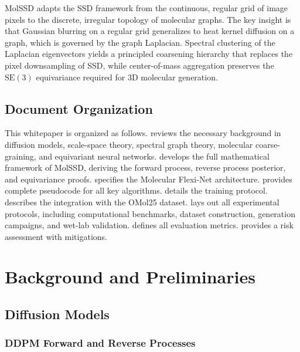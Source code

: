 \documentclass[12pt,a4paper]{article}
\begin{document}
MolSSD adapts the SSD framework from the continuous, regular grid of image pixels to the discrete, irregular topology of molecular graphs. The key insight is that Gaussian blurring on a regular grid generalizes to heat kernel diffusion on a graph, which is governed by the graph Laplacian. Spectral clustering of the Laplacian eigenvectors yields a principled coarsening hierarchy that replaces the pixel downsampling of SSD, while center-of-mass aggregation preserves the $\mathrm{SE}(3)$ equivariance required for 3D molecular generation.

\subsection{Document Organization}

This whitepaper is organized as follows.  reviews the necessary background in diffusion models, scale-space theory, spectral graph theory, molecular coarse-graining, and equivariant neural networks.  develops the full mathematical framework of MolSSD, deriving the forward process, reverse process posterior, and equivariance proofs.  specifies the Molecular Flexi-Net architecture.  provides complete pseudocode for all key algorithms.  details the training protocol.  describes the integration with the OMol25 dataset.  lays out all experimental protocols, including computational benchmarks, dataset construction, generation campaigns, and wet-lab validation.  defines all evaluation metrics.  provides a risk assessment with mitigations.

\section{Background and Preliminaries}\label{sec:background}

\subsection{Diffusion Models}\label{sec:bg_diffusion}

\subsubsection{DDPM Forward and Reverse Processes}
\end{document}
